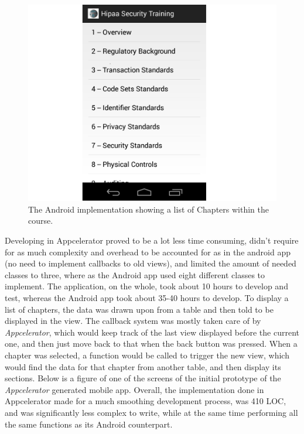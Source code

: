 \documentclass[11pt, twocolumn]{article}
\begin{document}
\begin{figure}[h!]
\includegraphics[scale=0.35]{android-chapter-implementation}
\caption{The Android implementation showing a list of Chapters within the course.}
\end{figure}

Developing in Appcelerator proved to be a lot less time consuming, didn't require for as much complexity and overhead to be accounted for as in the android app (no need to implement callbacks to old views), and limited the amount of needed classes to three, where as the Android app used eight different classes to implement.  The application, on the whole, took about 10 hours to develop and test, whereas the Android app took about 35-40 hours to develop.  To display a list of chapters, the data was drawn upon from a table and then told to be displayed in the view. The callback system was mostly taken care of by {\it Appcelerator}, which would keep track of the last view displayed before the current one, and then just move back to that when the back button was pressed.  When a chapter was selected, a function would be called to trigger the new view, which would find the data for that chapter from another table, and then display its sections.  Below is a figure of one of the screens of the initial prototype of the {\it Appcelerator} generated mobile app.  Overall, the implementation done in Appcelerator made for a much smoothing development process, was 410 LOC, and was significantly less complex to write, while at the same time performing all the same functions as its Android counterpart.\\
\end{document}
